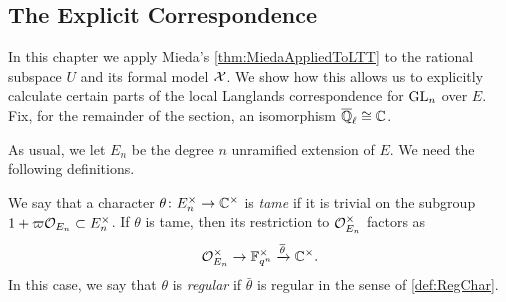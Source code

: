 \documentclass[../main.tex]{subfiles}
\begin{document}
\subsection{The Explicit Correspondence} %
\label{sub:The Explicit Correspondence}
In this chapter we apply Mieda's \cref{thm:MiedaAppliedToLTT} to the rational subspace
$U$ and its formal model $\mathcal{X}$. We show how this allows us to explicitly
calculate certain parts of the local Langlands correspondence for $\operatorname{GL}_n$ over
$E$. Fix, for the remainder of the section, an isomorphism ${\overline {\mathbb{Q}}_\ell} \cong \mathbb{C}$.

As usual, we let $E_n$ be the degree $n$ unramified extension of $E$. 
We need the following definitions.
\begin{defi}\label{def:TameCharacter}
  We say that a character $\theta\colon E_n^\times \to \mathbb{C}^\times$ is \emph{tame} if it is
  trivial on the subgroup $1 + \varpi \mathcal{O}_{E_n} \subset E_n^\times$. 
  If $\theta$ is tame, then its restriction to $\mathcal{O}_{E_n}^\times$ factors as
  $$\mathcal{O}_{E_n}^\times \to \mathbb{F}_{q^n}^\times \xrightarrow{\overline \theta} \mathbb{C}^\times.$$ 
  In this case, we say that $\theta$ is \emph{regular} if $\bar \theta$ is
  regular in the sense of \cref{def:RegChar}. 
\end{defi}
\end{document}
